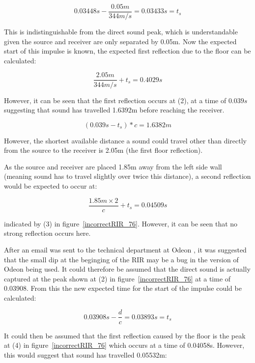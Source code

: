 \documentclass[../../main.tex]{subfiles}
\begin{document}
			\begin{equation}
			 0.03448s - \frac{0.05m}{344m/s} = 0.03433s = t_s
			\end{equation}

			This is indistinguishable from the direct sound peak, which is understandable given the source and receiver are only separated by 0.05m. Now the expected start of this impulse is known, the expected first reflection due to the floor can be calculated:

			\begin{equation}
			\frac{2.05m}{344m/s} + t_s = 0.4029s
			\end{equation}

			However, it can be seen that the first reflection occurs at (2), at a time of $0.039s$ suggesting that sound has travelled 1.6392m before reaching the receiver. 

			\begin{equation}
			(0.039s - t_s)*c = 1.6382m
			\end{equation}

			However, the shortest available distance a sound could travel other than directly from the source to the receiver is 2.05m (the first floor reflection).

			As the source and receiver are placed 1.85m away from the left side wall (meaning sound has to travel slightly over twice this distance), a second reflection would be expected to occur at:

			\begin{equation}
			\frac{1.85m\times{2}}{c} + t_s = 0.04509s
			\end{equation}

			indicated by (3) in figure~\ref{incorrectRIR_76}. However, it can be seen that no strong reflection occurs here.

			After an email was sent to the technical department at Odeon \cite{odeonEmail}, it was suggested that the small dip at the beginging of the \ac{RIR} may be a bug in the version of Odeon being used. It could therefore be assumed that the direct sound is actually captured at the peak shown at (2) in figure~\ref{incorrectRIR_76} at a time of $0.03908$. From this the new expected time for the start of the impulse could be calculated:

			\begin{equation}
			0.03908s - \frac{d}{c} = 0.03893s = t_s
			\end{equation}

			It could then be assumed that the first reflection caused by the floor is the peak at (4) in figure~\ref{incorrectRIR_76} which occurs at a time of 0.04058s. However, this would suggest that sound has travelled 0.05532m:
\end{document}
